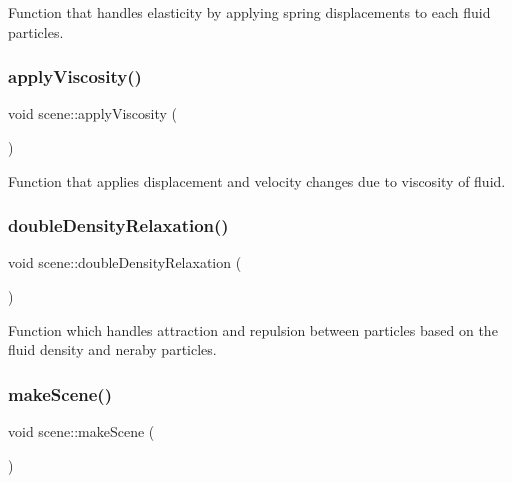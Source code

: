 Function that handles elasticity by applying spring displacements to each fluid particles. 

\hypertarget{classscene_a7595aeca99db7ac7e6d2c6b1bfe0b0f9}{}\label{classscene_a7595aeca99db7ac7e6d2c6b1bfe0b0f9} 
\subsubsection{\texorpdfstring{apply\+Viscosity()}{applyViscosity()}}
{\footnotesize\ttfamily void scene\+::apply\+Viscosity (\begin{DoxyParamCaption}{ }\end{DoxyParamCaption})}



Function that applies displacement and velocity changes due to viscosity of fluid. 

\hypertarget{classscene_a448751b5e9bad5d73901b765fc2b8a38}{}\label{classscene_a448751b5e9bad5d73901b765fc2b8a38} 
\subsubsection{\texorpdfstring{double\+Density\+Relaxation()}{doubleDensityRelaxation()}}
{\footnotesize\ttfamily void scene\+::double\+Density\+Relaxation (\begin{DoxyParamCaption}{ }\end{DoxyParamCaption})}



Function which handles attraction and repulsion between particles based on the fluid density and neraby particles. 

\hypertarget{classscene_a91f9f8fd971538eb19ff1877e50746f8}{}\label{classscene_a91f9f8fd971538eb19ff1877e50746f8} 
\subsubsection{\texorpdfstring{make\+Scene()}{makeScene()}}
{\footnotesize\ttfamily void scene\+::make\+Scene (\begin{DoxyParamCaption}{ }\end{DoxyParamCaption})}



